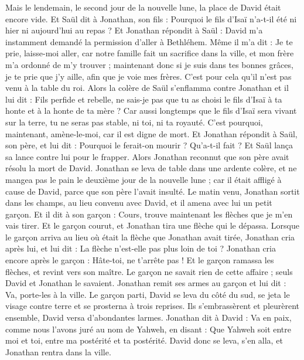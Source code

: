 \begin{multicols}{2}
Mais le lendemain, le second jour de la nouvelle lune, la place de David était encore vide. Et Saül dit à Jonathan, son fils : Pourquoi le fils d'Isaï n'a-t-il été ni hier ni aujourd'hui au repas ?
Et Jonathan répondit à Saül : David m'a instamment demandé la permission d'aller à Bethléhem.
Même il m'a dit : Je te prie, laisse-moi aller, car notre famille fait un sacrifice dans la ville, et mon frère m'a ordonné de m'y trouver ; maintenant donc si je suis dans tes bonnes grâces, je te prie que j'y aille, afin que je voie mes frères. C'est pour cela qu'il n'est pas venu à la table du roi.
Alors la colère de Saül s'enflamma contre Jonathan et il lui dit : Fils perfide et rebelle, ne sais-je pas que tu as choisi le fils d'Isaï à ta honte et à la honte de ta mère ?
Car aussi longtemps que le fils d'Isaï sera vivant sur la terre, tu ne seras pas stable, ni toi, ni ta royauté. C'est pourquoi, maintenant, amène-le-moi, car il est digne de mort.
Et Jonathan répondit à Saül, son père, et lui dit : Pourquoi le ferait-on mourir ? Qu'a-t-il fait ?
Et Saül lança sa lance contre lui pour le frapper. Alors Jonathan reconnut que son père avait résolu la mort de David.
Jonathan se leva de table dans une ardente colère, et ne mangea pas le pain le deuxième jour de la nouvelle lune ; car il était affligé à cause de David, parce que son père l'avait insulté.
Le matin venu, Jonathan sortit dans les champs, au lieu convenu avec David, et il amena avec lui un petit garçon.
Et il dit à son garçon : Cours, trouve maintenant les flèches que je m'en vais tirer. Et le garçon courut, et Jonathan tira une flèche qui le dépassa.
Lorsque le garçon arriva au lieu où était la flèche que Jonathan avait tirée, Jonathan cria après lui, et lui dit : La flèche n'est-elle pas plus loin de toi ?
Jonathan cria encore après le garçon : Hâte-toi, ne t'arrête pas ! Et le garçon ramassa les flèches, et revint vers son maître.
Le garçon ne savait rien de cette affaire ; seuls David et Jonathan le savaient.
Jonathan remit ses armes au garçon et lui dit : Va, porte-les à la ville.
Le garçon parti, David se leva du côté du sud, se jeta le visage contre terre et se prosterna à trois reprises. Ils s'embrassèrent et pleurèrent ensemble, David versa d'abondantes larmes.
Jonathan dit à David : Va en paix, comme nous l'avons juré au nom de Yahweh, en disant : Que Yahweh soit entre moi et toi, entre ma postérité et ta postérité.
David donc se leva, s'en alla, et Jonathan rentra dans la ville.

\end{multicols}
